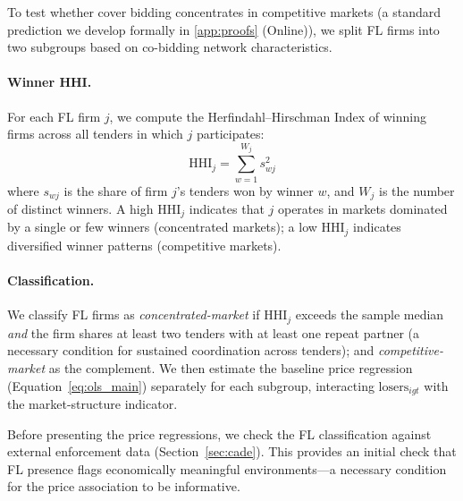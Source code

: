 To test whether cover bidding concentrates in competitive markets
(a standard prediction we develop formally in
\ref{app:proofs} (Online)), we split FL firms into two
subgroups based on co-bidding network characteristics.

\paragraph{Winner HHI.}
For each FL firm $j$, we compute the Herfindahl--Hirschman Index of
winning firms across all tenders in which $j$ participates:
\begin{equation}
  \text{HHI}_j = \sum_{w=1}^{W_j} s_{wj}^2
  \label{eq:winner_hhi}
\end{equation}
where $s_{wj}$ is the share of firm $j$'s tenders won by winner $w$,
and $W_j$ is the number of distinct winners. A high $\text{HHI}_j$
indicates that $j$ operates in markets dominated by a single or few
winners (concentrated markets); a low $\text{HHI}_j$ indicates
diversified winner patterns (competitive markets).

\paragraph{Classification.}
We classify FL firms as \emph{concentrated-market} if
$\text{HHI}_j$ exceeds the sample median \emph{and} the firm shares
at least two tenders with at least one repeat partner (a necessary
condition for sustained coordination across tenders); and
\emph{competitive-market} as the complement. We then estimate the
baseline price regression (Equation~\ref{eq:ols_main}) separately
for each subgroup, interacting $\text{losers}_{igt}$ with the
market-structure indicator.

Before presenting the price regressions, we check the FL
classification against external enforcement data
(Section~\ref{sec:cade}). This provides an initial check that FL presence flags
economically meaningful environments---a necessary condition for the
price association to be informative.
